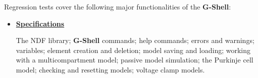 \documentclass[12pt]{article}
\begin{document}
Regression tests cover the following major functionalities of the {\bf G-Shell}:
\begin{itemize}
\item[]\href{http://www.neurospaces.org/neurospaces_project/gshell/tests/html/index.html}{\bf Specifications}

The NDF library; {\bf G-Shell} commands; help commands; errors and warnings; variables; element creation and deletion; model saving and loading; working with a multicompartment model; passive model simulation; the Purkinje cell model; checking and resetting models; voltage clamp models.

\end{itemize}
\end{document}
